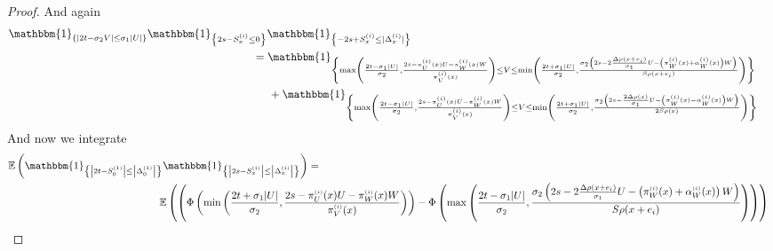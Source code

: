 \documentclass[12pt]{article}
\theoremstyle{Theorem}
\begin{document}
\begin{proof}
And again 
{\small
\begin{align*}
\mathbbm{1}_{\left\{ |2t - \sigma_{2}V| \leq \sigma_{1}|U|\right\}}\mathbbm{1}_{\left\{ 2s - S^{\scriptscriptstyle (i)}_{\scriptscriptstyle x} \leq 0 \right\}}\mathbbm{1}_{\left\{ -2s + S^{\scriptscriptstyle (i)}_{\scriptscriptstyle x} \leq |\Delta^{\scriptscriptstyle (i)}_ {\scriptscriptstyle x}|\right\}} \\
& \hspace{-5cm} = \mathbbm{1}_{\left\{ \max\left(\frac{2t - \sigma_{1}|U|}{\sigma_{2}},\frac{2s -   \pi^{\scriptscriptstyle (i)}_{U}(x)U - \pi^{\scriptscriptstyle (i)}_{W}(x)W}{\pi^{\scriptscriptstyle (i)}_{V}(x)}\right)  \leq V \leq \min\left(\frac{2t + \sigma_{1}|U|}{\sigma_{2}}, \frac{\sigma_{2}\left(2s - 2\frac{\Delta\rho(x+e_i)}{\sigma_1}U -  \left(\pi^{\scriptscriptstyle (i)}_{W}(x) + \alpha^{\scriptscriptstyle (i)}_{W}(x)\right)W\right)}{S\rho(x+e_i)}\right) \right\}} \\
& \hspace{-4.5cm} + \mathbbm{1}_{\left\{ \max\left(\frac{2t - \sigma_{1}|U|}{\sigma_{2}}, \frac{2s -   \pi^{\scriptscriptstyle (i)}_{U}(x)U - \pi^{\scriptscriptstyle (i)}_{W}(x)W}{\pi^{\scriptscriptstyle (i)}_{V}(x)}\right)  \leq V \leq \min\left(\frac{2t + \sigma_{1}|U|}{\sigma_{2}}, \frac{\sigma_{2}\left(2s -\frac{2\Delta\rho(x)}{\sigma_1}U - \left(\pi^{\scriptscriptstyle (i)}_{W}(x) - \alpha^{\scriptscriptstyle (i)}_{W}(x)\right)W\right)}{2S\rho(x)}\right) \right\}} 
\end{align*}}
And now we integrate 
{\tiny 
\begin{align*}
\mathbb{E}\left(\mathbbm{1}_{\left\{ \left|2t - S^{\scriptscriptstyle (1)}_{\scriptscriptstyle 0}\right| \leq \left|\Delta^{\scriptscriptstyle (1)}_{\scriptscriptstyle 0}\right|\right\}}\mathbbm{1}_{\left\{ \left|2s - S^{\scriptscriptstyle (i)}_{\scriptscriptstyle x}\right| \leq \left|\Delta^{\scriptscriptstyle (i)}_x\right| \right\}}\right) & = \\
& \hspace{-5cm} \mathbb{E}\left(\left(\Phi\left( \min\left(\frac{2t + \sigma_{1}|U|}{\sigma_{2}}, \frac{2s - \pi^{\scriptscriptstyle (i)}_{U}(x)U - \pi^{\scriptscriptstyle (i)}_{W}(x)W}{\pi^{\scriptscriptstyle (i)}_{V}(x)}\right)\right) - \Phi\left(\max\left(\frac{2t - \sigma_{1}|U|}{\sigma_{2}},\frac{\sigma_{2}\left(2s - 2\frac{\Delta\rho(x+e_i)}{\sigma_1}U -  \left(\pi^{\scriptscriptstyle (i)}_{W}(x) + \alpha^{\scriptscriptstyle (i)}_{W}(x)\right)W\right)}{S\rho(x+e_i)}\right) \right) \right)\right.\\

\end{align*}}
\end{proof}
\end{document}
